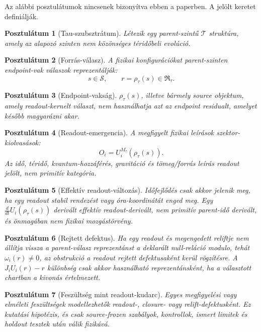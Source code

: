 \documentclass[12pt]{article}
\newtheorem{postulate}{Posztulátum}
\newcommand{\T}{\mathcal T}
\newcommand{\Ssrc}{\mathcal S}
\newcommand{\RTspace}{\mathfrak R_{\tau}}
\newcommand{\Rmap}{\rho_{\tau}}
\newcommand{\Mta}{M_{\tau}}
\begin{document}
Az alábbi posztulátumok nincsenek bizonyítva ebben a paperben.  A jelölt
keretet definiálják.

\begin{postulate}[Tau-szubsztrátum]
Létezik egy parent-szintű \(\T\) struktúra, amely az alapozó szinten nem
közönséges téridőbeli evolúció.
\end{postulate}

\begin{postulate}[Forrás-válasz]
A fizikai konfigurációkat parent-szinten endpoint-vak válaszok reprezentálják:
\[
  s\in\Ssrc,\qquad r=\Rmap(s)\in\RTspace.
\]
\end{postulate}

\begin{postulate}[Endpoint-vakság]
\(\Rmap(s)\), illetve bármely source objektum, amely readout-kernelt választ,
nem használhatja azt az endpoint residualt, amelyet később magyarázni akar.
\end{postulate}

\begin{postulate}[Readout-emergencia]
A megfigyelt fizikai leírások szektor-kiolvasások:
\[
  O_i=U_i^{\Mta}(\Rmap(s)).
\]
Az idő, téridő, kvantum-hozzáférés, gravitáció és tömeg/forrás leírás readout
jelölt, nem primitív kategória.
\end{postulate}

\begin{postulate}[Effektív readout-változás]
Időfejlődés csak akkor jelenik meg, ha egy readout stabil rendezést vagy
óra-koordinátát enged meg.  Egy \(\frac{d}{dt}U_i(\Rmap(s))\) derivált
effektív readout-derivált, nem primitív parent-idő derivált, és önmagában nem
fizikai mozgástörvény.
\end{postulate}

\begin{postulate}[Rejtett defektus]
Ha egy readout és megengedett reliftje nem állítja vissza a parent-válasz
reprezentánst a deklarált null-reláció modulo, tehát
\(\omega_i(r)\neq0\), az obstrukció a readout rejtett defektusaként kerül
rögzítésre.  A \(J_iU_i(r)-r\) különbség csak akkor használható
reprezentánsként, ha a választott chartban a kivonás értelmezett.
\end{postulate}

\begin{postulate}[Feszültség mint readout-kudarc]
Egyes megfigyelési vagy elméleti feszültségek modellezhetők readout-, closure-
vagy relift-defektusként.  Ez kutatási hipotézis, és csak source-frozen
szabályok, kontrollok, ismert limitek és holdout tesztek után válik fizikává.
\end{postulate}
\end{document}
